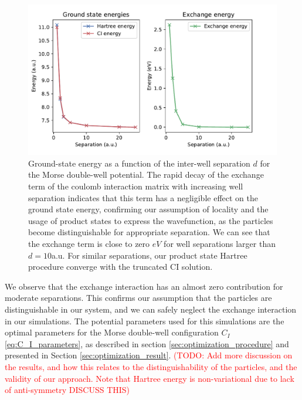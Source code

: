 \documentclass{subfiles}
\begin{document}
\begin{figure}[h!]
    \centering
    \includegraphics[width=1.0\textwidth]{figs/exchange_shift.pdf}
    \caption{Ground-state energy as a function of the inter-well separation $d$ for the Morse double-well potential. The rapid decay of the exchange term of the coulomb interaction matrix with increasing well separation indicates that this term has a negligible effect on the ground state energy, confirming our assumption of locality and the usage of product states to express the wavefunction, as the particles become distinguishable for appropriate separation. We can see that the exchange term is close to zero $eV$ for well separations larger than $d = 10$a.u. For similar separations, our product state Hartree procedure converge with the truncated CI solution. }
    \label{fig:exchange_shift}
\end{figure}
We observe that the exchange interaction has an almost zero contribution for moderate separations. This confirms our assumption that the particles are distinguishable in our system, and we can safely neglect the exchange interaction in our simulations. The potential parameters used for this simulations are the optimal parameters for the Morse double-well configuration $C_I$ \eqref{eq:C_I_parameters}, as described in section \ref{sec:optimization_procedure} and presented in Section \ref{sec:optimization_result}. \textcolor{red}{(TODO: Add more discussion on the results, and how this relates to the distinguishability of the particles, and the validity of our approach. Note that Hartree energy is non-variational due to lack of anti-symmetry DISCUSS THIS)} \\
\end{document}
